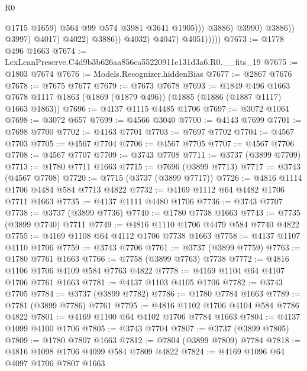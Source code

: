 \begin{lexlean}{R0}
\begin{coremodule}
                                            @1715
                                            @1659)
                                          @564
                                          @99
                                          @574
                                          @3981
                                          @3641
                                          @1905)))
                                    @3886)
                                  @3990)
                                @3886))
                            @3997)
                          @4017)
                        @4022)
                      @3886))
                  @4032)
                @4047)
              @4051)))))
@7673 := @1778 @496 @1663
@7674 := LexLeanPreserve.C4d9b3b626aa856ea55220911e131d3a6.R0.__fits_19
@7675 := @1803 @7674
@7676 := Models.Recognizer.hiddenBias
@7677 := @2867 @7676
@7678 := @7675 @7677
@7679 := @7673 @7678
@7693 := @1849
    @496
    @1663
    @7678
    @1117
    @1863
    (@1869 (@1879 @496))
    (@1885 (@1886 (@1887 @1117) @1663 @1863))
@7696 := @4137 @1115 @4485 @1706
@7697 := @3072 @1064
@7698 := @3072 @657
@7699 := @4566 @3040
@7700 := @4143 @7699
@7701 := @7698 @7700
@7702 := @4163 @7701
@7703 := @7697 @7702
@7704 := @4567 @7703
@7705 := @4567 @7704
@7706 := @4567 @7705
@7707 := @4567 @7706
@7708 := @4567 @7707
@7709 := @3743 @7708
@7711 := @3737 (@3899 @7709)
@7713 := @1780 @7711 @1663
@7715 := @7696 (@3899 @7713)
@7717 := @3743 (@4567 @7708)
@7720 := @7715 (@3737 (@3899 @7717))
@7726 := @4816 @1114 @1706 @4484 @584 @7713 @4822
@7732 := @4169 @1112 @64 @4482 @1706 @7711 @1663
@7735 := @4137 @1111 @4480 @1706
@7736 := @3743 @7707
@7738 := @3737 (@3899 @7736)
@7740 := @1780 @7738 @1663
@7743 := @7735 (@3899 @7740) @7711
@7749 := @4816 @1110 @1706 @4479 @584 @7740 @4822
@7755 := @4169 @1108 @64 @4112 @1706 @7738 @1663
@7758 := @4137 @1107 @4110 @1706
@7759 := @3743 @7706
@7761 := @3737 (@3899 @7759)
@7763 := @1780 @7761 @1663
@7766 := @7758 (@3899 @7763) @7738
@7772 := @4816 @1106 @1706 @4109 @584 @7763 @4822
@7778 := @4169 @1104 @64 @4107 @1706 @7761 @1663
@7781 := @4137 @1103 @4105 @1706
@7782 := @3743 @7705
@7784 := @3737 (@3899 @7782)
@7786 := @1780 @7784 @1663
@7789 := @7781 (@3899 @7786) @7761
@7795 := @4816 @1102 @1706 @4104 @584 @7786 @4822
@7801 := @4169 @1100 @64 @4102 @1706 @7784 @1663
@7804 := @4137 @1099 @4100 @1706
@7805 := @3743 @7704
@7807 := @3737 (@3899 @7805)
@7809 := @1780 @7807 @1663
@7812 := @7804 (@3899 @7809) @7784
@7818 := @4816 @1098 @1706 @4099 @584 @7809 @4822
@7824 := @4169 @1096 @64 @4097 @1706 @7807 @1663

\end{coremodule}
\end{lexlean}
